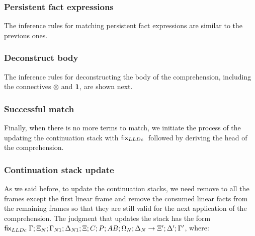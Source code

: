 

\subsubsection{Persistent fact expressions}

The inference rules for matching persistent fact expressions are similar to the
previous ones.



\subsubsection{Deconstruct body}

The inference rules for deconstructing the body of the comprehension, including
the connectives $\otimes$ and $\mathbf{1}$, are shown next.



\subsubsection{Successful match}

Finally, when there is no more terms to match, we initiate the process of the
updating the continuation stack with $\mathsf{fix}_{LLDc} \;$ followed by deriving the head of the
comprehension.



\subsubsection{Continuation stack update}

As we said before, to update the continuation stacks, we need remove to all the
frames except the first linear frame and remove the consumed linear facts from
the remaining frames so that they are still valid for the next application of
the comprehension.  The judgment that updates the stack has the form $\mathsf{fix}_{LLDc} \;
\Gamma; \Xi_N; \Gamma_{N1}; \Delta_{N1}; \Xi; C; P; AB; \Omega_N; \Delta_N
\rightarrow \Xi'; \Delta'; \Gamma'$, where:

